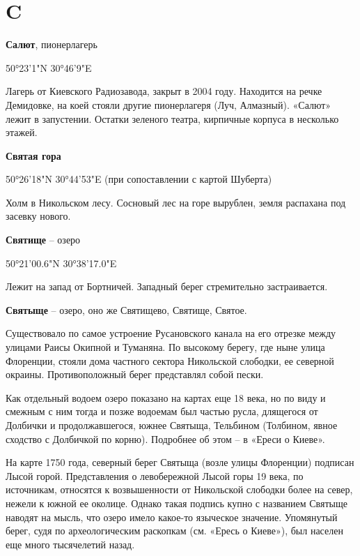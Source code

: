 \chapter*{C}

\textbf{Салют}, пионерлагерь

50°23'1"N 30°46'9"E

Лагерь от Киевского Радиозавода, закрыт в 2004 году. Находится на речке Демидовке, на коей стояли другие пионерлагеря (Луч, Алмазный). «Салют» лежит в запустении. Остатки зеленого театра, кирпичные корпуса в несколько этажей.\\

\medskip


\textbf{Святая гора}

50°26'18"N 30°44'53"E (при сопоставлении с картой Шуберта)

Холм в Никольском лесу. Сосновый лес на горе вырублен, земля распахана под засевку нового.\\

\medskip


\textbf{Святище} – озеро 

50°21'00.6"N 30°38'17.0"E

Лежит на запад от Бортничей. Западный берег стремительно застраивается.\\

\medskip


\textbf{Святыще} – озеро, оно же Святищево, Святище, Святое. 

Существовало по самое устроение Русановского канала на его отрезке между улицами Раисы Окипной и Туманяна. По высокому берегу, где ныне улица Флоренции, стояли дома частного сектора Никольской слободки, ее северной окраины. Противоположный берег представлял собой пески.

Как отдельный водоем озеро показано на картах еще 18 века, но по виду и смежным с ним тогда и позже водоемам был частью русла, длящегося от Долбички и продолжавшегося, южнее Святыща, Тельбином (Толбином, явное сходство с Долбичкой по корню). Подробнее об этом – в «Ереси о Киеве».

На карте 1750 года, северный берег Святыща (возле улицы Флоренции) подписан Лысой горой. Представления о левобережной Лысой горы 19 века, по источникам, относятся к возвышенности от Никольской слободки более на север, нежели к южной ее околице. Однако такая подпись купно с названием Святыще наводят на мысль, что озеро имело какое-то языческое значение. Упомянутый берег, судя по археологическим раскопкам (см. «Ересь о Киеве»), был населен еще много тысячелетий назад.

